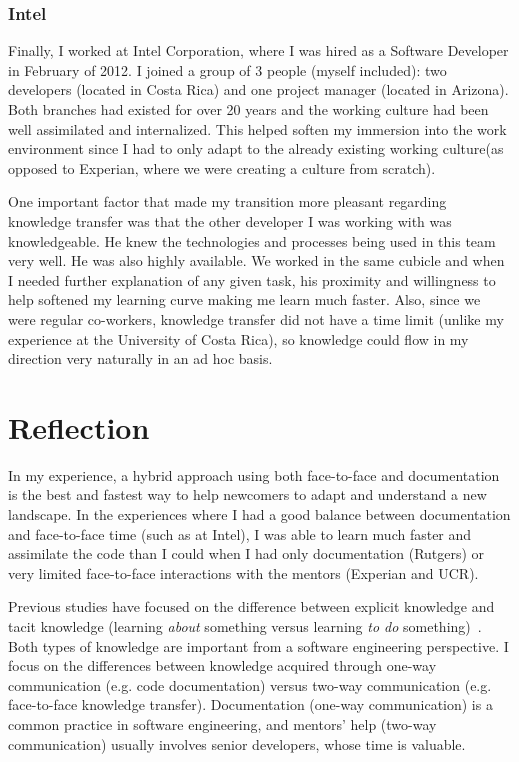 \documentclass[12pt, letterpaper]{article}
\begin{document}
\subsubsection{Intel}
Finally, I worked at Intel Corporation, where I was hired
as a Software Developer in February of 2012. I joined a group of 3 people (myself included):
two developers (located in Costa Rica) and one project manager (located in Arizona). Both branches
had existed for over 20 years and the working culture had been well assimilated and internalized. 
This helped soften my immersion into the work environment since I had to only adapt to the already
existing working culture(as opposed to Experian, where we were creating a culture from scratch).

One important factor that made my transition more pleasant regarding knowledge transfer was that 
the other developer I was working with was knowledgeable. He knew the technologies and processes
being used in this team very well.
He was also highly available. We worked in the same cubicle and when I needed further explanation of any given 
task, his proximity and willingness
to help softened my learning curve making me 
learn much faster. Also, since we were regular co-workers, knowledge transfer did not have a
time limit (unlike my experience at the University of Costa Rica), so knowledge could flow in my
direction very naturally in an ad hoc basis. 


\section{Reflection}

In my experience, a hybrid approach using both face-to-face and documentation is 
the best and fastest way to help newcomers to adapt and understand
a new landscape. In the experiences where I had a good balance between documentation and face-to-face time
(such as at Intel), I was able to learn much faster and assimilate the code than I could when
I had only documentation (Rutgers) or very limited face-to-face interactions with the mentors (Experian and 
UCR). 

Previous studies have focused on the difference between explicit knowledge and tacit knowledge (learning \textit{about} 
something versus learning \textit{to do} something)~\cite{cook99,civi00}. Both types of knowledge are important from a software
engineering perspective. I focus on the differences between knowledge 
acquired through one-way communication (e.g. code documentation) versus two-way communication (e.g. face-to-face knowledge transfer). 
Documentation (one-way communication) is a common practice in software engineering, 
and mentors' help (two-way communication) usually involves senior developers, 
whose time is valuable. 
\end{document}
